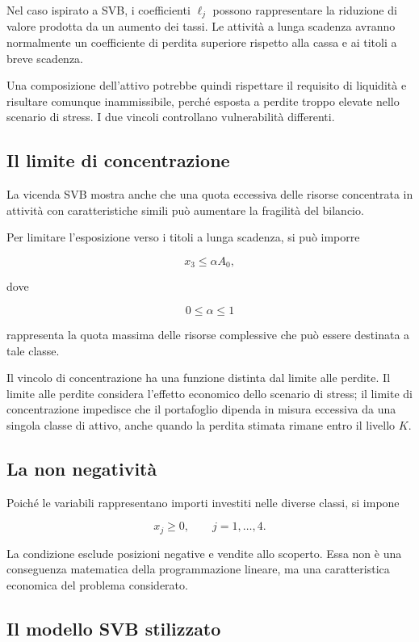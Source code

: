 Nel caso ispirato a SVB, i coefficienti $\ell_j$ possono rappresentare la
riduzione di valore prodotta da un aumento dei tassi. Le attivit\`a a lunga
scadenza avranno normalmente un coefficiente di perdita superiore rispetto
alla cassa e ai titoli a breve scadenza.

Una composizione dell'attivo potrebbe quindi rispettare il requisito di
liquidit\`a e risultare comunque inammissibile, perch\'e esposta a perdite
troppo elevate nello scenario di stress. I due vincoli controllano
vulnerabilit\`a differenti.

\subsection{Il limite di concentrazione}

La vicenda SVB mostra anche che una quota eccessiva delle risorse concentrata
in attivit\`a con caratteristiche simili pu\`o aumentare la fragilit\`a del
bilancio.

Per limitare l'esposizione verso i titoli a lunga scadenza, si pu\`o imporre

\[
x_3\leq \alpha A_0,
\]

\noindent dove

\[
0\leq\alpha\leq1
\]

\noindent rappresenta la quota massima delle risorse complessive che pu\`o essere
destinata a tale classe.

Il vincolo di concentrazione ha una funzione distinta dal limite alle perdite.
Il limite alle perdite considera l'effetto economico dello scenario di stress;
il limite di concentrazione impedisce che il portafoglio dipenda in misura
eccessiva da una singola classe di attivo, anche quando la perdita stimata
rimane entro il livello $K$.

\subsection{La non negativit\`a}

Poich\'e le variabili rappresentano importi investiti nelle diverse classi, si
impone

\[
x_j\geq0,
\qquad
j=1,\ldots,4.
\]

La condizione esclude posizioni negative e vendite allo scoperto. Essa non \`e
una conseguenza matematica della programmazione lineare, ma una caratteristica
economica del problema considerato.

\subsection{Il modello SVB stilizzato}

